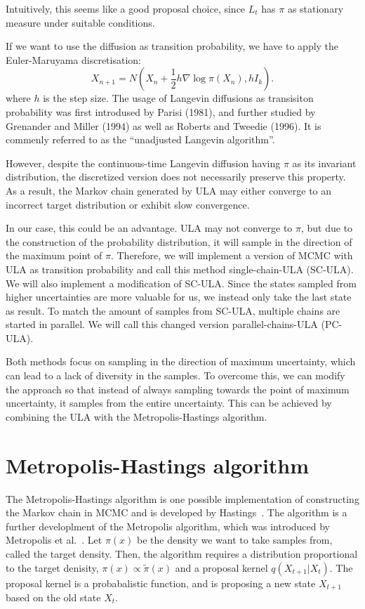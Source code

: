 Intuitively, this seems like a good proposal choice, since 
$L_t$ has $\pi$ as stationary measure under suitable conditions. 

If we want to use the diffusion as transition probability, we have to apply the Euler-Maruyama discretisation:
\begin{equation}
    \label{eq:langevin-diffusion}
    X_{n+1}=N(X_n+\frac{1}{2}h\nabla\log{\pi(X_n)}, hI_k).
\end{equation}
where $h$ is the step size.
The usage of Langevin diffusions as transisiton probability was first introdused by Parisi (1981), and further studied by Grenander and Miller (1994) as well as Roberts and Tweedie (1996). It is commenly referred to as the ``unadjusted Langevin algorithm''.

However, despite the continuous-time Langevin diffusion having 
$\pi$ as its invariant distribution, the discretized version does not necessarily preserve this property. As a result, the Markov chain generated by ULA may either converge to an incorrect target distribution or exhibit slow convergence.

In our case, this could be an advantage. ULA may not converge to $\pi$, but due to the construction of the probability distribution, it will sample in the direction of the maximum point of $\pi$. Therefore, we will implement a version of MCMC with ULA as transition probability and call this method single-chain-ULA (SC-ULA). We will also implement a modification of SC-ULA. 
Since the states sampled from higher uncertainties are more valuable for us, we instead only take the last state as result. To match the amount of samples from SC-ULA, multiple chains are started in parallel. We will call this changed version parallel-chains-ULA (PC-ULA). 

Both methods focus on sampling in the direction of maximum uncertainty, which can lead to a lack of diversity in the samples. To overcome this, we can modify the approach so that instead of always sampling towards the point of maximum uncertainty, it samples from the entire uncertainty. This can be achieved by combining the ULA with the Metropolis-Hastings algorithm.
\section{Metropolis-Hastings algorithm}
The Metropolis-Hastings algorithm is one possible implementation of constructing the Markov chain in MCMC and 
is developed by Hastings~\cite{hastings1970}. The algorithm is a further developlment of the Metropolis algorithm, which was introduced by Metropolis et al.~\cite{metropolis1953}.
Let $\pi(x)$ be the density we want to take samples from, called the target density.
Then, the algorithm requires a distribution proportional to the target denisity, $\pi(x)\propto\tilde{\pi}(x)$ and a proposal kernel $q(X_{t+1}|X_t)$.
The proposal kernel is a probabalistic function, and is proposing a new state $X_{t+1}$ based on the old state $X_t$.

